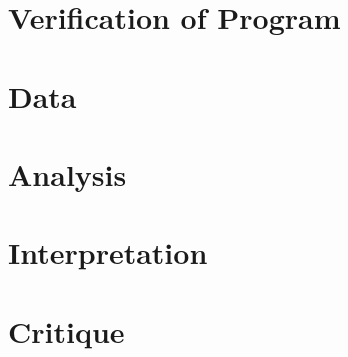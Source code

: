 \documentclass{article}%
\begin{document}
\section{Verification of Program} 

    
    \section{Data}
    \section{Analysis}

    \section{Interpretation}

    \section{Critique} 

    \nocite{*}
    
    
\end{document}
